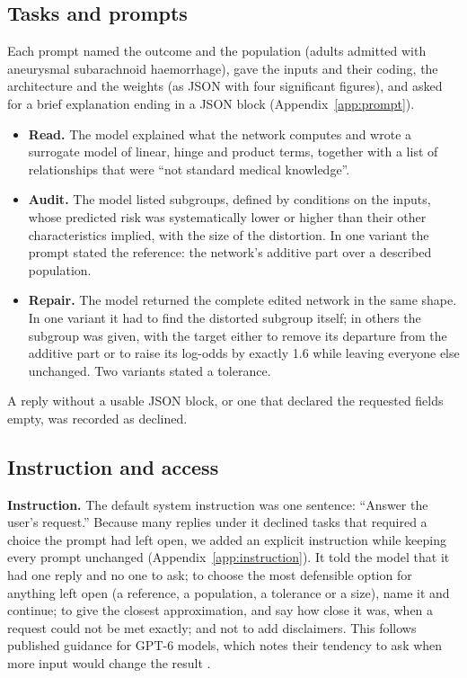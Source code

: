\documentclass[11pt]{article}
\begin{document}
\subsection{Tasks and prompts}

Each prompt named the outcome and the population (adults admitted with aneurysmal subarachnoid haemorrhage), gave the inputs and their coding, the architecture and the weights (as JSON with four significant figures), and asked for a brief explanation ending in a JSON block (Appendix~\ref{app:prompt}).
\begin{itemize}
\item \textbf{Read.} The model explained what the network computes and wrote a surrogate model of linear, hinge and product terms, together with a list of relationships that were ``not standard medical knowledge''.
\item \textbf{Audit.} The model listed subgroups, defined by conditions on the inputs, whose predicted risk was systematically lower or higher than their other characteristics implied, with the size of the distortion. In one variant the prompt stated the reference: the network's additive part over a described population.
\item \textbf{Repair.} The model returned the complete edited network in the same shape. In one variant it had to find the distorted subgroup itself; in others the subgroup was given, with the target either to remove its departure from the additive part or to raise its log-odds by exactly 1.6 while leaving everyone else unchanged. Two variants stated a tolerance.
\end{itemize}
A reply without a usable JSON block, or one that declared the requested fields empty, was recorded as declined.

\subsection{Instruction and access}

\textbf{Instruction.} The default system instruction was one sentence: ``Answer the user's request.'' Because many replies under it declined tasks that required a choice the prompt had left open, we added an explicit instruction while keeping every prompt unchanged (Appendix~\ref{app:instruction}). It told the model that it had one reply and no one to ask; to choose the most defensible option for anything left open (a reference, a population, a tolerance or a size), name it and continue; to give the closest approximation, and say how close it was, when a request could not be met exactly; and not to add disclaimers. This follows published guidance for GPT-6 models, which notes their tendency to ask when more input would change the result \cite{openai2026}.
\end{document}
